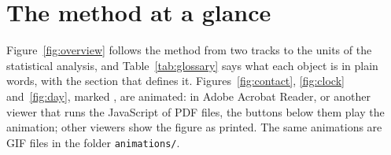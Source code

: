 \section*{The method at a glance}

Figure~\ref{fig:overview} follows the method from two tracks to the units of the statistical
analysis, and Table~\ref{tab:glossary} says what each object is in plain words, with the section
that defines it. Figures~\ref{fig:contact}, \ref{fig:clock} and~\ref{fig:day}, marked
\animmark, are animated: in Adobe Acrobat Reader, or another viewer that runs the JavaScript of
PDF files, the buttons below them play the animation; other viewers show the figure as printed.
The same animations are GIF files in the folder \texttt{animations/}.

